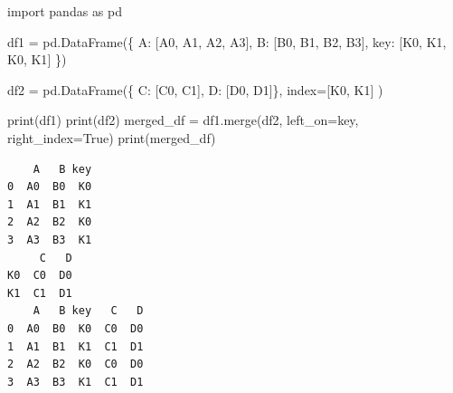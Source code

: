 \documentclass[
  english,
  letterpaper,
  DIV=11,
  numbers=noendperiod]{scrreprt}
\newenvironment{Shaded}{\begin{snugshade}}{\end{snugshade}}
\newcommand{\BuiltInTok}[1]{\textcolor[rgb]{0.00,0.23,0.31}{#1}}
\newcommand{\ImportTok}[1]{\textcolor[rgb]{0.00,0.46,0.62}{#1}}
\newcommand{\NormalTok}[1]{\textcolor[rgb]{0.00,0.23,0.31}{#1}}
\newcommand{\OperatorTok}[1]{\textcolor[rgb]{0.37,0.37,0.37}{#1}}
\newcommand{\StringTok}[1]{\textcolor[rgb]{0.13,0.47,0.30}{#1}}
\newcommand{\VariableTok}[1]{\textcolor[rgb]{0.07,0.07,0.07}{#1}}
\begin{document}
\begin{Shaded}
\begin{Highlighting}[]
\ImportTok{import}\NormalTok{ pandas }\ImportTok{as}\NormalTok{ pd}

\NormalTok{df1 }\OperatorTok{=}\NormalTok{ pd.DataFrame(\{}
    \StringTok{\textquotesingle{}A\textquotesingle{}}\NormalTok{: [}\StringTok{\textquotesingle{}A0\textquotesingle{}}\NormalTok{, }\StringTok{\textquotesingle{}A1\textquotesingle{}}\NormalTok{, }\StringTok{\textquotesingle{}A2\textquotesingle{}}\NormalTok{, }\StringTok{\textquotesingle{}A3\textquotesingle{}}\NormalTok{],}
    \StringTok{\textquotesingle{}B\textquotesingle{}}\NormalTok{: [}\StringTok{\textquotesingle{}B0\textquotesingle{}}\NormalTok{, }\StringTok{\textquotesingle{}B1\textquotesingle{}}\NormalTok{, }\StringTok{\textquotesingle{}B2\textquotesingle{}}\NormalTok{, }\StringTok{\textquotesingle{}B3\textquotesingle{}}\NormalTok{],}
    \StringTok{\textquotesingle{}key\textquotesingle{}}\NormalTok{: [}\StringTok{\textquotesingle{}K0\textquotesingle{}}\NormalTok{, }\StringTok{\textquotesingle{}K1\textquotesingle{}}\NormalTok{, }\StringTok{\textquotesingle{}K0\textquotesingle{}}\NormalTok{, }\StringTok{\textquotesingle{}K1\textquotesingle{}}\NormalTok{]}
\NormalTok{\})}

\NormalTok{df2 }\OperatorTok{=}\NormalTok{ pd.DataFrame(\{}
    \StringTok{\textquotesingle{}C\textquotesingle{}}\NormalTok{: [}\StringTok{\textquotesingle{}C0\textquotesingle{}}\NormalTok{, }\StringTok{\textquotesingle{}C1\textquotesingle{}}\NormalTok{],}
    \StringTok{\textquotesingle{}D\textquotesingle{}}\NormalTok{: [}\StringTok{\textquotesingle{}D0\textquotesingle{}}\NormalTok{, }\StringTok{\textquotesingle{}D1\textquotesingle{}}\NormalTok{]\},}
\NormalTok{    index}\OperatorTok{=}\NormalTok{[}\StringTok{\textquotesingle{}K0\textquotesingle{}}\NormalTok{, }\StringTok{\textquotesingle{}K1\textquotesingle{}}\NormalTok{]}
\NormalTok{)}

\BuiltInTok{print}\NormalTok{(df1)}
\BuiltInTok{print}\NormalTok{(df2)}
\NormalTok{merged\_df }\OperatorTok{=}\NormalTok{ df1.merge(df2, left\_on}\OperatorTok{=}\StringTok{\textquotesingle{}key\textquotesingle{}}\NormalTok{, right\_index}\OperatorTok{=}\VariableTok{True}\NormalTok{)}
\BuiltInTok{print}\NormalTok{(merged\_df)}
\end{Highlighting}
\end{Shaded}

\begin{verbatim}
    A   B key
0  A0  B0  K0
1  A1  B1  K1
2  A2  B2  K0
3  A3  B3  K1
     C   D
K0  C0  D0
K1  C1  D1
    A   B key   C   D
0  A0  B0  K0  C0  D0
1  A1  B1  K1  C1  D1
2  A2  B2  K0  C0  D0
3  A3  B3  K1  C1  D1
\end{verbatim}
\end{document}
